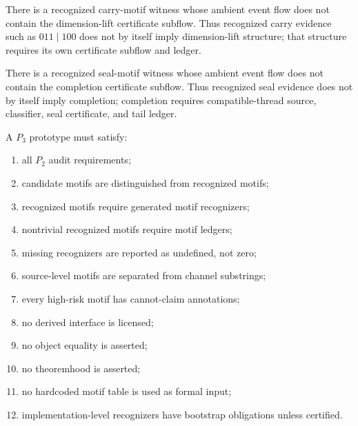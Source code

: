 \begin{corollary}
\label{cor:motif-report-carry-not-dimlift}
There is a recognized carry-motif witness whose ambient event flow does not contain the dimension-lift certificate subflow. Thus recognized carry evidence such as $011\mid 100$ does not by itself imply dimension-lift structure; that structure requires its own certificate subflow and ledger.
\end{corollary}

\begin{corollary}
\label{cor:motif-report-seal-not-completion}
There is a recognized seal-motif witness whose ambient event flow does not contain the completion certificate subflow. Thus recognized seal evidence does not by itself imply completion; completion requires compatible-thread source, classifier, seal certificate, and tail ledger.
\end{corollary}

\begin{definition}
\label{def:motif-report-p3-audit}
A $P_3$ prototype must satisfy:
\begin{enumerate}
\item all $P_2$ audit requirements;
\item candidate motifs are distinguished from recognized motifs;
\item recognized motifs require generated motif recognizers;
\item nontrivial recognized motifs require motif ledgers;
\item missing recognizers are reported as undefined, not zero;
\item source-level motifs are separated from channel substrings;
\item every high-risk motif has cannot-claim annotations;
\item no derived interface is licensed;
\item no object equality is asserted;
\item no theoremhood is asserted;
\item no hardcoded motif table is used as formal input;
\item implementation-level recognizers have bootstrap obligations unless certified.
\end{enumerate}
\end{definition}


